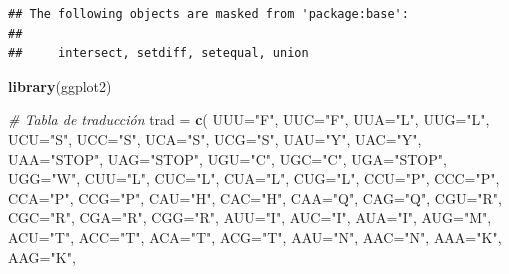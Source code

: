 \documentclass[
]{article}
\newenvironment{Shaded}{\begin{snugshade}}{\end{snugshade}}
\newcommand{\AttributeTok}[1]{\textcolor[rgb]{0.13,0.29,0.53}{#1}}
\newcommand{\CommentTok}[1]{\textcolor[rgb]{0.56,0.35,0.01}{\textit{#1}}}
\newcommand{\FunctionTok}[1]{\textcolor[rgb]{0.13,0.29,0.53}{\textbf{#1}}}
\newcommand{\NormalTok}[1]{#1}
\newcommand{\OtherTok}[1]{\textcolor[rgb]{0.56,0.35,0.01}{#1}}
\newcommand{\StringTok}[1]{\textcolor[rgb]{0.31,0.60,0.02}{#1}}
\begin{document}
\begin{verbatim}
## The following objects are masked from 'package:base':
## 
##     intersect, setdiff, setequal, union
\end{verbatim}

\begin{Shaded}
\begin{Highlighting}[]
\FunctionTok{library}\NormalTok{(ggplot2)}

\CommentTok{\# Tabla de traducción}
\NormalTok{trad }\OtherTok{=} \FunctionTok{c}\NormalTok{(}
  \AttributeTok{UUU=}\StringTok{"F"}\NormalTok{, }\AttributeTok{UUC=}\StringTok{"F"}\NormalTok{, }\AttributeTok{UUA=}\StringTok{"L"}\NormalTok{, }\AttributeTok{UUG=}\StringTok{"L"}\NormalTok{,}
  \AttributeTok{UCU=}\StringTok{"S"}\NormalTok{, }\AttributeTok{UCC=}\StringTok{"S"}\NormalTok{, }\AttributeTok{UCA=}\StringTok{"S"}\NormalTok{, }\AttributeTok{UCG=}\StringTok{"S"}\NormalTok{,}
  \AttributeTok{UAU=}\StringTok{"Y"}\NormalTok{, }\AttributeTok{UAC=}\StringTok{"Y"}\NormalTok{, }\AttributeTok{UAA=}\StringTok{"STOP"}\NormalTok{, }\AttributeTok{UAG=}\StringTok{"STOP"}\NormalTok{,}
  \AttributeTok{UGU=}\StringTok{"C"}\NormalTok{, }\AttributeTok{UGC=}\StringTok{"C"}\NormalTok{, }\AttributeTok{UGA=}\StringTok{"STOP"}\NormalTok{, }\AttributeTok{UGG=}\StringTok{"W"}\NormalTok{,}
  \AttributeTok{CUU=}\StringTok{"L"}\NormalTok{, }\AttributeTok{CUC=}\StringTok{"L"}\NormalTok{, }\AttributeTok{CUA=}\StringTok{"L"}\NormalTok{, }\AttributeTok{CUG=}\StringTok{"L"}\NormalTok{,}
  \AttributeTok{CCU=}\StringTok{"P"}\NormalTok{, }\AttributeTok{CCC=}\StringTok{"P"}\NormalTok{, }\AttributeTok{CCA=}\StringTok{"P"}\NormalTok{, }\AttributeTok{CCG=}\StringTok{"P"}\NormalTok{,}
  \AttributeTok{CAU=}\StringTok{"H"}\NormalTok{, }\AttributeTok{CAC=}\StringTok{"H"}\NormalTok{, }\AttributeTok{CAA=}\StringTok{"Q"}\NormalTok{, }\AttributeTok{CAG=}\StringTok{"Q"}\NormalTok{,}
  \AttributeTok{CGU=}\StringTok{"R"}\NormalTok{, }\AttributeTok{CGC=}\StringTok{"R"}\NormalTok{, }\AttributeTok{CGA=}\StringTok{"R"}\NormalTok{, }\AttributeTok{CGG=}\StringTok{"R"}\NormalTok{,}
  \AttributeTok{AUU=}\StringTok{"I"}\NormalTok{, }\AttributeTok{AUC=}\StringTok{"I"}\NormalTok{, }\AttributeTok{AUA=}\StringTok{"I"}\NormalTok{, }\AttributeTok{AUG=}\StringTok{"M"}\NormalTok{,}
  \AttributeTok{ACU=}\StringTok{"T"}\NormalTok{, }\AttributeTok{ACC=}\StringTok{"T"}\NormalTok{, }\AttributeTok{ACA=}\StringTok{"T"}\NormalTok{, }\AttributeTok{ACG=}\StringTok{"T"}\NormalTok{,}
  \AttributeTok{AAU=}\StringTok{"N"}\NormalTok{, }\AttributeTok{AAC=}\StringTok{"N"}\NormalTok{, }\AttributeTok{AAA=}\StringTok{"K"}\NormalTok{, }\AttributeTok{AAG=}\StringTok{"K"}\NormalTok{,}

\end{Highlighting}
\end{Shaded}
\end{document}
